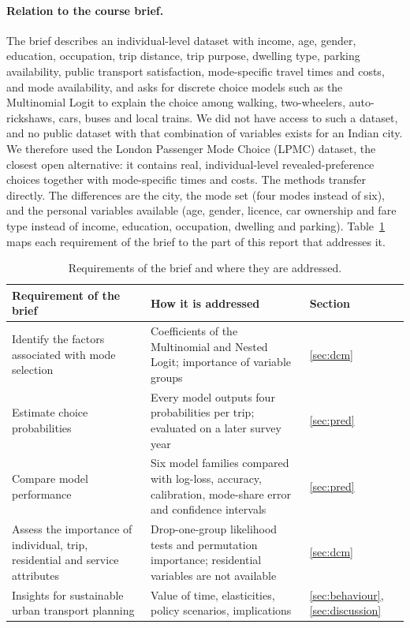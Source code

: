 \documentclass[11pt,a4paper]{article}
\begin{document}
\paragraph{Relation to the course brief.}
The brief describes an individual-level dataset with income, age, gender, education, occupation, trip distance, trip purpose, dwelling type, parking availability, public transport satisfaction, mode-specific travel times and costs, and mode availability, and asks for discrete choice models such as the Multinomial Logit to explain the choice among walking, two-wheelers, auto-rickshaws, cars, buses and local trains. We did not have access to such a dataset, and no public dataset with that combination of variables exists for an Indian city. We therefore used the London Passenger Mode Choice (LPMC) dataset, the closest open alternative: it contains real, individual-level revealed-preference choices together with mode-specific times and costs. The methods transfer directly. The differences are the city, the mode set (four modes instead of six), and the personal variables available (age, gender, licence, car ownership and fare type instead of income, education, occupation, dwelling and parking). Table~\ref{tab:brief} maps each requirement of the brief to the part of this report that addresses it.

\begin{table}[H]
\centering\small
\begin{tabularx}{\textwidth}{>{\raggedright\arraybackslash}X>{\raggedright\arraybackslash}X>{\raggedright\arraybackslash}p{2.6cm}}
\toprule
Requirement of the brief & How it is addressed & Section \\
\midrule
Identify the factors associated with mode selection & Coefficients of the Multinomial and Nested Logit; importance of variable groups & \ref{sec:dcm} \\
Estimate choice probabilities & Every model outputs four probabilities per trip; evaluated on a later survey year & \ref{sec:pred} \\
Compare model performance & Six model families compared with log-loss, accuracy, calibration, mode-share error and confidence intervals & \ref{sec:pred} \\
Assess the importance of individual, trip, residential and service attributes & Drop-one-group likelihood tests and permutation importance; residential variables are not available & \ref{sec:dcm} \\
Insights for sustainable urban transport planning & Value of time, elasticities, policy scenarios, implications & \ref{sec:behaviour}, \ref{sec:discussion} \\
\bottomrule
\end{tabularx}
\caption{Requirements of the brief and where they are addressed.}
\label{tab:brief}
\end{table}
\end{document}
